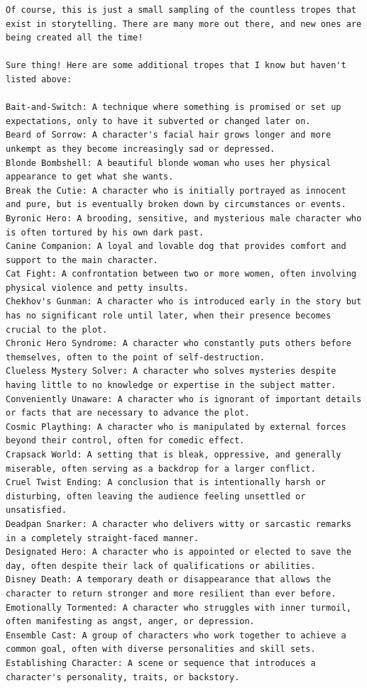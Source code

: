 \documentclass[11pt]{article}
\begin{document}
\begin{lstlisting}
Of course, this is just a small sampling of the countless tropes that exist in storytelling. There are many more out there, and new ones are being created all the time!

Sure thing! Here are some additional tropes that I know but haven't listed above:

Bait-and-Switch: A technique where something is promised or set up expectations, only to have it subverted or changed later on.
Beard of Sorrow: A character's facial hair grows longer and more unkempt as they become increasingly sad or depressed.
Blonde Bombshell: A beautiful blonde woman who uses her physical appearance to get what she wants.
Break the Cutie: A character who is initially portrayed as innocent and pure, but is eventually broken down by circumstances or events.
Byronic Hero: A brooding, sensitive, and mysterious male character who is often tortured by his own dark past.
Canine Companion: A loyal and lovable dog that provides comfort and support to the main character.
Cat Fight: A confrontation between two or more women, often involving physical violence and petty insults.
Chekhov's Gunman: A character who is introduced early in the story but has no significant role until later, when their presence becomes crucial to the plot.
Chronic Hero Syndrome: A character who constantly puts others before themselves, often to the point of self-destruction.
Clueless Mystery Solver: A character who solves mysteries despite having little to no knowledge or expertise in the subject matter.
Conveniently Unaware: A character who is ignorant of important details or facts that are necessary to advance the plot.
Cosmic Plaything: A character who is manipulated by external forces beyond their control, often for comedic effect.
Crapsack World: A setting that is bleak, oppressive, and generally miserable, often serving as a backdrop for a larger conflict.
Cruel Twist Ending: A conclusion that is intentionally harsh or disturbing, often leaving the audience feeling unsettled or unsatisfied.
Deadpan Snarker: A character who delivers witty or sarcastic remarks in a completely straight-faced manner.
Designated Hero: A character who is appointed or elected to save the day, often despite their lack of qualifications or abilities.
Disney Death: A temporary death or disappearance that allows the character to return stronger and more resilient than ever before.
Emotionally Tormented: A character who struggles with inner turmoil, often manifesting as angst, anger, or depression.
Ensemble Cast: A group of characters who work together to achieve a common goal, often with diverse personalities and skill sets.
Establishing Character: A scene or sequence that introduces a character's personality, traits, or backstory.



\end{lstlisting}
\end{document}
